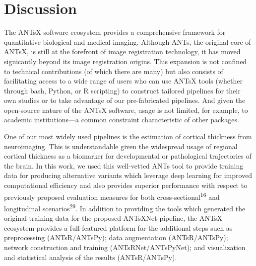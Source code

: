 \documentclass[12pt,]{article}
\begin{document}
\hypertarget{discussion}{%
\section*{Discussion}\label{discussion}}

The ANTsX software ecosystem provides a comprehensive framework for
quantitative biological and medical imaging. Although ANTs, the original
core of ANTsX, is still at the forefront of image registration
technology, it has moved signicantly beyond its image registration
origins. This expansion is not confined to technical contributions (of
which there are many) but also consists of facilitating access to a wide
range of users who can use ANTsX tools (whether through bash, Python, or
R scripting) to construct tailored pipelines for their own studies or to
take advantage of our pre-fabricated pipelines. And given the
open-source nature of the ANTsX software, usage is not limited, for
example, to academic institutions---a common constraint characteristic
of other packages.

One of our most widely used pipelines is the estimation of cortical
thickness from neuroimaging. This is understandable given the widespread
usage of regional cortical thickness as a biomarker for developmental or
pathological trajectories of the brain. In this work, we used this
well-vetted ANTs tool to provide training data for producing alternative
variants which leverage deep learning for improved computational
efficiency and also provides superior performance with respect to
previously proposed evaluation measures for both
cross-sectional\textsuperscript{16} and longitudinal
scenarios\textsuperscript{29}. In addition to providing the tools which
generated the original training data for the proposed ANTsXNet pipeline,
the ANTsX ecosystem provides a full-featured platform for the additional
steps such as preprocessing (ANTsR/ANTsPy); data augmentation
(ANTsR/ANTsPy); network construction and training (ANTsRNet/ANTsPyNet);
and visualization and statistical analysis of the results
(ANTsR/ANTsPy).
\end{document}
